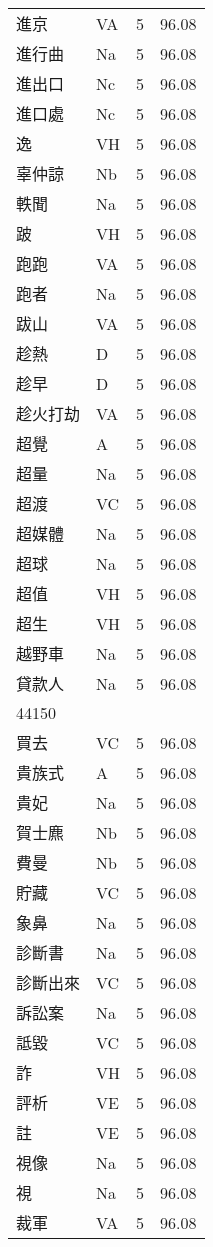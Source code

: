 \documentclass[twocolumn]{book}
\begin{document}
\begin{supertabular}{llrr}
進京 & VA & 5 &  96.08\\
進行曲 & Na & 5 &  96.08\\
進出口 & Nc & 5 &  96.08\\
進口處 & Nc & 5 &  96.08\\
逸 & VH & 5 &  96.08\\
辜仲諒 & Nb & 5 &  96.08\\
軼聞 & Na & 5 &  96.08\\
跛 & VH & 5 &  96.08\\
跑跑 & VA & 5 &  96.08\\
跑者 & Na & 5 &  96.08\\
跋山 & VA & 5 &  96.08\\
趁熱 & D & 5 &  96.08\\
趁早 & D & 5 &  96.08\\
趁火打劫 & VA & 5 &  96.08\\
超覺 & A & 5 &  96.08\\
超量 & Na & 5 &  96.08\\
超渡 & VC & 5 &  96.08\\
超媒體 & Na & 5 &  96.08\\
超球 & Na & 5 &  96.08\\
超值 & VH & 5 &  96.08\\
超生 & VH & 5 &  96.08\\
越野車 & Na & 5 &  96.08\\
貸款人 & Na & 5 &  96.08\\
44150\\
買去 & VC & 5 &  96.08\\
貴族式 & A & 5 &  96.08\\
貴妃 & Na & 5 &  96.08\\
賀士麃 & Nb & 5 &  96.08\\
費曼 & Nb & 5 &  96.08\\
貯藏 & VC & 5 &  96.08\\
象鼻 & Na & 5 &  96.08\\
診斷書 & Na & 5 &  96.08\\
診斷出來 & VC & 5 &  96.08\\
訴訟案 & Na & 5 &  96.08\\
詆毀 & VC & 5 &  96.08\\
詐 & VH & 5 &  96.08\\
評析 & VE & 5 &  96.08\\
註 & VE & 5 &  96.08\\
視像 & Na & 5 &  96.08\\
視 & Na & 5 &  96.08\\
裁軍 & VA & 5 &  96.08\\

\end{supertabular}
\end{document}
